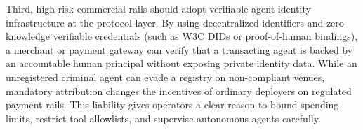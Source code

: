 Third, high-risk commercial rails should adopt verifiable agent identity infrastructure at the protocol layer. By using decentralized identifiers and zero-knowledge verifiable credentials (such as W3C DIDs or proof-of-human bindings), a merchant or payment gateway can verify that a transacting agent is backed by an accountable human principal without exposing private identity data. While an unregistered criminal agent can evade a registry on non-compliant venues, mandatory attribution changes the incentives of ordinary deployers on regulated payment rails. This liability gives operators a clear reason to bound spending limits, restrict tool allowlists, and supervise autonomous agents carefully.
